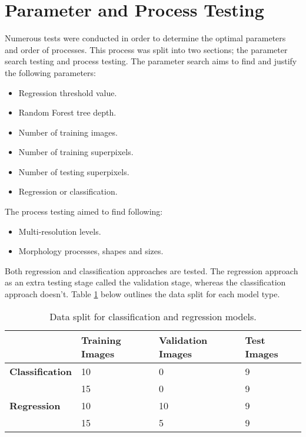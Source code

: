 \section{Parameter and Process Testing}
\label{sect:paramtest}
Numerous tests were conducted in order to determine the optimal parameters and order of processes.  This process was split into two sections; the parameter search testing and process testing. The parameter search aims to find and justify the following parameters:
\begin{itemize}
\item Regression threshold value.
\item Random Forest tree depth.
\item Number of training images.
\item Number of training superpixels.
\item Number of testing superpixels.
\item Regression or classification.
\end{itemize}
\bigskip
The process testing aimed to find following:
\begin{itemize}
\item Multi-resolution levels.
\item Morphology processes, shapes and sizes.
\end{itemize}
Both regression and classification approaches are tested. The regression approach as an extra testing stage called the validation stage, whereas the classification approach doesn't. Table \ref{table:alldatasplit} below outlines the data split for each model type.
\begin{table}[H]
\centering
\caption{Data split for classification and regression models.}

\begin{tabular}{|l|l|l|l|}
\hline
& 	\textbf{Training Images}  & \textbf{Validation Images} & \textbf{Test Images}\\
\hline
\textbf{Classification}	&  10 & 0 & 9\\ \cline{2-4}
	& 	15 & 0 & 9		\\
\hline
\textbf{Regression} & 10 & 10 & 9\\ \cline{2-4}
	& 	15 & 5 & 9\\
\hline		    	 			   			    	 
\end{tabular}
\label{table:alldatasplit}
\end{table}

